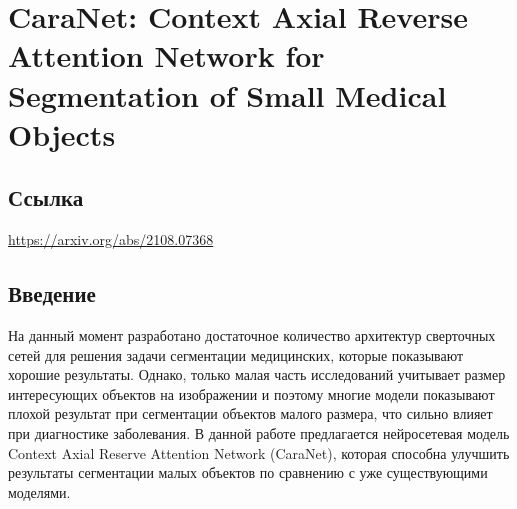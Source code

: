 
\section{CaraNet: Context Axial Reverse Attention Network for Segmentation of Small Medical Objects}

\subsection*{Ссылка} \url{https://arxiv.org/abs/2108.07368}
\subsection*{Введение}
 На данный момент разработано достаточное количество архитектур 
 сверточных сетей для решения задачи сегментации медицинских, которые 
 показывают хорошие результаты. Однако, только малая часть 
 исследований учитывает размер интересующих объектов на изображении
 и поэтому многие модели показывают плохой результат при сегментации
 объектов малого размера, что сильно влияет при диагностике заболевания.
 В данной работе предлагается нейросетевая модель Context Axial
 Reserve Attention Network (CaraNet), которая способна улучшить 
 результаты сегментации малых объектов по сравнению с уже существующими
 моделями.
